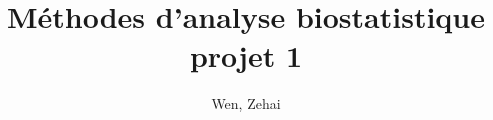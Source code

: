 \documentclass[12pt]{report}
\title{Méthodes d'analyse biostatistique projet 1}
\author{Wen, Zehai }
\date{\DTMnow}
\theoremstyle{plain}
\theoremstyle{definition}
\begin{document}
\begin{CJK*}{UTF8}{gbsn}
\maketitle

\setcounter{tocdepth}{0}









\end{CJK*}
\end{document}
